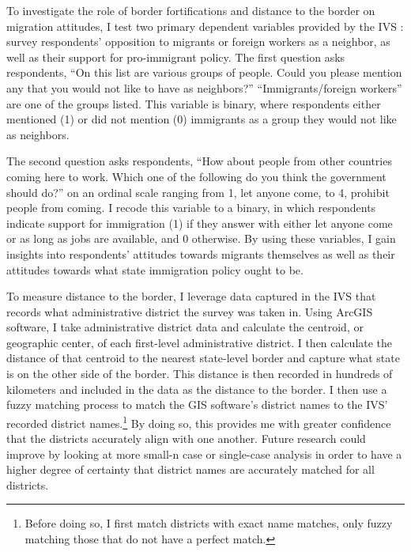 \documentclass[12pt,]{article}
\begin{document}
To investigate the role of border fortifications and distance to the
border on migration attitudes, I test two primary dependent variables
provided by the IVS \citep{evs2022, hearpfer2024}: survey respondents'
opposition to migrants or foreign workers as a neighbor, as well as
their support for pro-immigrant policy. The first question asks
respondents, ``On this list are various groups of people. Could you
please mention any that you would not like to have as neighbors?''
``Immigrants/foreign workers'' are one of the groups listed. This
variable is binary, where respondents either mentioned (1) or did not
mention (0) immigrants as a group they would not like as neighbors.

The second question asks respondents, ``How about people from other
countries coming here to work. Which one of the following do you think
the government should do?'' on an ordinal scale ranging from 1, let
anyone come, to 4, prohibit people from coming. I recode this variable
to a binary, in which respondents indicate support for immigration (1)
if they answer with either let anyone come or as long as jobs are
available, and 0 otherwise. By using these variables, I gain insights
into respondents' attitudes towards migrants themselves as well as their
attitudes towards what state immigration policy ought to be.

To measure distance to the border, I leverage data captured in the IVS
that records what administrative district the survey was taken in. Using
ArcGIS software, I take administrative district data and calculate the
centroid, or geographic center, of each first-level administrative
district. I then calculate the distance of that centroid to the nearest
state-level border and capture what state is on the other side of the
border. This distance is then recorded in hundreds of kilometers and
included in the data as the distance to the border. I then use a fuzzy
matching process to match the GIS software's district names to the IVS'
recorded district names.\footnote{Before doing so, I first match
  districts with exact name matches, only fuzzy matching those that do
  not have a perfect match.} By doing so, this provides me with greater
confidence that the districts accurately align with one another. Future
research could improve by looking at more small-n case or single-case
analysis in order to have a higher degree of certainty that district
names are accurately matched for all districts.
\end{document}
